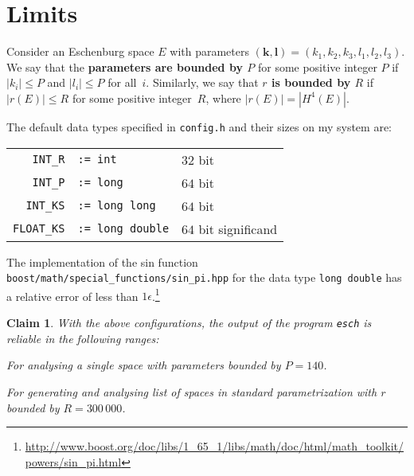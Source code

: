 \documentclass{article}
\newtheorem{claim}{Claim}
\newcommand{\abs}[1]{\left|#1\right|}
\renewcommand{\vec}[1]{\mathbf{#1}}
\newcommand{\macheps}{\epsilon} %
\begin{document}
\section*{Limits}
Consider an Eschenburg space \(E\) with parameters \((\vec k,\vec l) = (k_1,k_2,k_3,l_1,l_2,l_3)\).   We say that the \textbf{parameters are bounded by \(P\)} for some positive integer \(P\) if \(\abs{k_i}\leq P\) and \(\abs{l_i}\leq P\) for all~\(i\).  Similarly, we say that \textbf{\(r\) is bounded by \(R\)} if \(\abs{r(E)}\leq R\) for some positive integer~\(R\), where  \(\abs{r(E)} = |H^4(E)|\).  

The default data types specified in \verb+config.h+ and their sizes on my system are:
\begin{center}
  \begin{tabular}{rp{10em}l}
    \verb+INT_R+ & \texttt{:= int} & \(32\) bit \\
    \verb+INT_P+ & \texttt{:= long} &  \(64\) bit \\
    \verb+INT_KS+ & \texttt{:= long long} & \(64\) bit \\
    \verb+FLOAT_KS+ & \texttt{:= long double} & \(64\) bit significand
  \end{tabular}
\end{center}
The implementation of the sin function \verb+boost/math/special_functions/sin_pi.hpp+
for the data type \texttt{long double} has a relative error of less than \(1\macheps\).\footnote{
  \mbox{\url{http://www.boost.org/doc/libs/1_65_1/libs/math/doc/html/math_toolkit/powers/sin_pi.html}}}

\begin{claim}\label{claim:default}
  With the above configurations, the output of the program \verb+esch+ is reliable in the following ranges:
  \begin{compactitem}
  \item For analysing a single space with parameters bounded by \(P=140\).
  \item For generating and analysing list of spaces in standard parametrization with \(r\) bounded by \(R=300\,000\).
  \end{compactitem}
\end{claim}
\end{document}
